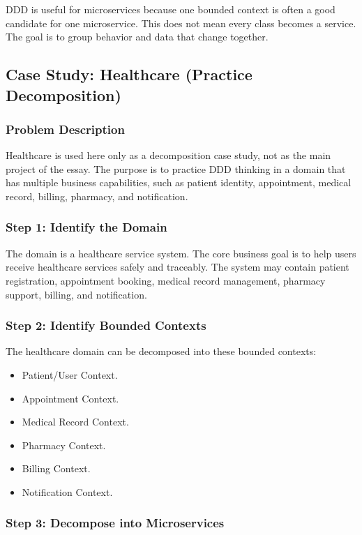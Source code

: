 \documentclass[12pt,a4paper]{article}
\begin{document}
DDD is useful for microservices because one bounded context is often a good candidate for one microservice. This does not mean every class becomes a service. The goal is to group behavior and data that change together.

\subsection{Case Study: Healthcare (Practice Decomposition)}

\subsubsection{Problem Description}

Healthcare is used here only as a decomposition case study, not as the main project of the essay. The purpose is to practice DDD thinking in a domain that has multiple business capabilities, such as patient identity, appointment, medical record, billing, pharmacy, and notification.

\subsubsection{Step 1: Identify the Domain}

The domain is a healthcare service system. The core business goal is to help users receive healthcare services safely and traceably. The system may contain patient registration, appointment booking, medical record management, pharmacy support, billing, and notification.

\subsubsection{Step 2: Identify Bounded Contexts}

The healthcare domain can be decomposed into these bounded contexts:

\begin{itemize}
    \item Patient/User Context.
    \item Appointment Context.
    \item Medical Record Context.
    \item Pharmacy Context.
    \item Billing Context.
    \item Notification Context.
\end{itemize}

\subsubsection{Step 3: Decompose into Microservices}
\end{document}
